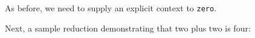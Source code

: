 \begin{fence}
\begin{code}
\\
%
\>[2]\AgdaSpace{}%
\AgdaSpace{}%
\AgdaSpace{}%
\AgdaSymbol{(}\AgdaSpace{}%
\AgdaSymbol{)}\AgdaSpace{}%
\<%
\\
\>[2][@{}l@{\AgdaIndent{0}}]%
\>[4]\AgdaSpace{}%
\AgdaSpace{}%
\AgdaSpace{}%
\<%
\\
%
\>[2]\AgdaSpace{}%
\AgdaSpace{}%
\AgdaSymbol{(}\AgdaSpace{}%
\AgdaSymbol{)}\AgdaSpace{}%
\<%
\\
\>[2][@{}l@{\AgdaIndent{0}}]%
\>[3]\AgdaSpace{}%
\AgdaSymbol{(}\AgdaSpace{}%
\AgdaSymbol{)}\<%
\\
%
\>[2]\<%
\end{code}
\end{fence}

As before, we need to supply an explicit context to
\texttt{\textasciigrave{}zero}.

Next, a sample reduction demonstrating that two plus two is four:

